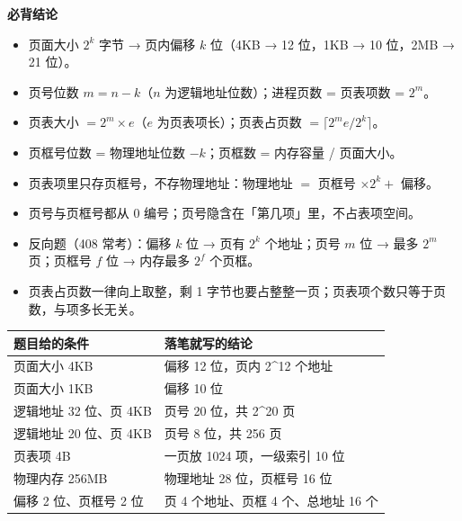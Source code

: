 \documentclass[10pt,a4paper]{ctexart}
\begin{document}



\textbf{必背结论}

\begin{itemize}

\item 页面大小 $2^k$ 字节 → 页内偏移 $k$ 位（4KB → 12 位，1KB → 10 位，2MB → 21 位）。

\item 页号位数 $m = n - k$（$n$ 为逻辑地址位数）；进程页数 = 页表项数 = $2^m$。

\item 页表大小 $= 2^m \times e$（$e$ 为页表项长）；页表占页数 $= \lceil 2^m e / 2^k \rceil$。

\item 页框号位数 = 物理地址位数 $- k$；页框数 = 内存容量 / 页面大小。

\item 页表项里只存页框号，不存物理地址：物理地址 $=$ 页框号 $\times 2^k +$ 偏移。

\item 页号与页框号都从 0 编号；页号隐含在「第几项」里，不占表项空间。

\item 反向题（408 常考）：偏移 $k$ 位 → 页有 $2^k$ 个地址；页号 $m$ 位 → 最多 $2^m$ 页；页框号 $f$ 位 → 内存最多 $2^f$ 个页框。

\item 页表占页数一律向上取整，剩 1 字节也要占整整一页；页表项个数只等于页数，与项多长无关。

\end{itemize}

\begin{center}\small
\begin{tabularx}{\linewidth}{@{}XX@{}}
\toprule
题目给的条件 & 落笔就写的结论 \\
\midrule
页面大小 4KB & 偏移 12 位，页内 2\textasciicircum{}12 个地址 \\
页面大小 1KB & 偏移 10 位 \\
逻辑地址 32 位、页 4KB & 页号 20 位，共 2\textasciicircum{}20 页 \\
逻辑地址 20 位、页 4KB & 页号 8 位，共 256 页 \\
页表项 4B & 一页放 1024 项，一级索引 10 位 \\
物理内存 256MB & 物理地址 28 位，页框号 16 位 \\
偏移 2 位、页框号 2 位 & 页 4 个地址、页框 4 个、总地址 16 个 \\
\bottomrule
\end{tabularx}
\end{center}
\end{document}

